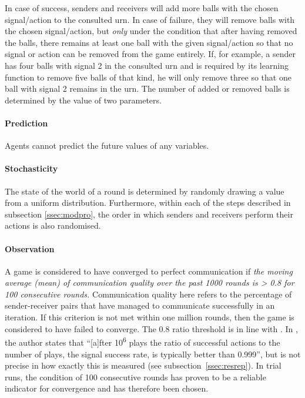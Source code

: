 \documentclass[
	DIV=calc,
	BCOR=0mm,
	pagesize,
	titlepage
]{scrartcl}
\begin{document}
In case of success, senders and receivers will add more balls with the chosen signal/action to the consulted urn.
In case of failure, they will remove balls with the chosen signal/action, but \emph{only} under the condition that after having removed the balls, there remains at least one ball with the given signal/action so that no signal or action can be removed from the game entirely.
If, for example, a sender has four balls with signal 2 in the consulted urn and is required by its learning function to remove five balls of that kind, he will only remove three so that one ball with signal 2 remains in the urn.
The number of added or removed balls is determined by the value of two parameters.

\paragraph{Prediction}
Agents cannot predict the future values of any variables.

\paragraph{Stochasticity}
The state of the world of a round is determined by randomly drawing a value from a uniform distribution.
Furthermore, within each of the steps described in subsection \ref{ssec:modpro}, the order in which senders and receivers perform their actions is also randomised.

\paragraph{Observation}
A game is considered to have converged to perfect communication if \emph{the moving average (mean) of communication quality over the past 1000 rounds is > 0.8 for 100 consecutive rounds.}
Communication quality here refers to the percentage of sender-receiver pairs that have managed to communicate successfully in an iteration.
If this criterion is not met within one million rounds, then the game is considered to have failed to converge.
The 0.8 ratio threshold is in line with \citet[p.~533]{barrett_numerical_2006, barrett_dynamic_2007}.
In \citet[sec.~2, unpaginated preprint]{barrett_numerical_2006}, the author states that ``[a]fter 10\textsuperscript{6} plays the ratio of successful actions to the number of plays, the signal success rate, is typically better than 0.999'', but is not precise in how exactly this is measured (see subsection~\ref{ssec:resrep}).
In trial runs, the condition of 100 consecutive rounds has proven to be a reliable indicator for convergence and has therefore been chosen.
\end{document}
